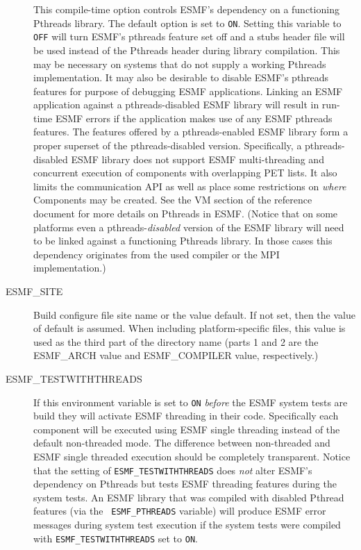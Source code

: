\begin{description}
This compile-time option controls ESMF's dependency on a functioning
Pthreads library. The default option is set to {\tt ON}. Setting this
variable to {\tt OFF} will turn ESMF's pthreads feature set off and a
stubs header file will be used instead of the Pthreads header during
library compilation. This may be necessary on systems that do not
supply a working Pthreads implementation. It may also be desirable to
disable ESMF's pthreads features for purpose of debugging ESMF
applications. Linking an ESMF application against a pthreads-disabled
ESMF library will result in run-time ESMF errors if the application
makes use of any ESMF pthreads features. The features offered by a
pthreads-enabled ESMF library form a proper superset of the
pthreads-disabled version. Specifically, a pthreads-disabled ESMF
library does not support ESMF multi-threading and concurrent execution
of components with overlapping PET lists. It also limits the
communication API as well as place some restrictions on {\em where}
Components may be created. See the VM section of the reference
document for more details on Pthreads in ESMF. (Notice that on some
platforms even a pthreads-{\em disabled} version of the ESMF library
will need to be linked against a functioning Pthreads library. In
those cases this dependency originates from the used compiler or the
MPI implementation.)

\item[ESMF\_SITE] 
Build configure file site name or the value default.  
If not set, then the value of default is assumed.
When including platform-specific files, this value is used as the
third part of the directory name (parts 1 and 2 are the
ESMF\_ARCH value and ESMF\_COMPILER value, respectively.)

\item[ESMF\_TESTWITHTHREADS]

If this environment variable is set to {\tt ON} {\em before} the ESMF system
tests are build they will activate ESMF threading in their code. Specifically
each component will be executed using ESMF single threading instead of the
default non-threaded mode. The difference between non-threaded and ESMF
single threaded execution should be completely transparent. Notice that the
setting of {\tt ESMF\_TESTWITHTHREADS} does {\em not} alter ESMF's dependency
on Pthreads but tests ESMF threading features during the system tests. An
ESMF library that was compiled with disabled Pthread features (via the {\tt
ESMF\_PTHREADS} variable) will produce ESMF error messages during system test
execution if the system tests were compiled with {\tt ESMF\_TESTWITHTHREADS}
set to {\tt ON}.

\end{description}

